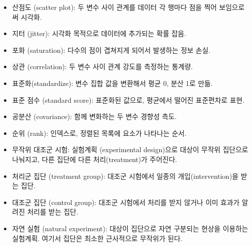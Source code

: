 \begin{itemize}

\item 산점도 (scatter plot): 두 변수 사이 관계를 데이터 각 행마다 점을 찍어 보임으로써 시각화.

\item 지터 (jitter): 시각화 목적으로 데이터에 추가되는 확률 잡음.

\item 포화 (saturation): 다수의 점이 겹쳐지게 되어서 발생하는 정보 손실.

\item 상관 (correlation): 두 변수 사이 관계 강도를 측정하는 통계량.

\item 표준화(standardize): 변수 집합 값을 변환해서 평균 0, 분산 1로 만듦.

\item 표준 점수 (standard score): 표준화된 값으로, 평균에서 떨어진 표준편차로 표현.

\item 공분산 (covariance): 함께 변화하는 두 변수 경향성 측도.

\item 순위 (rank): 인덱스로, 정렬된 목록에 요소가 나타나는 순서.

\item 무작위 대조군 시험: 실험계획 (experimental design)으로 대상이 무작위 집단으로 나눠지고, 다른 집단에 다른 처리(treatment)가 주어진다.

\item 처리군 집단 (treatment group): 대조군 시험에서 일종의 개입(intervention)을 받는 집단.

\item 대조군 집단 (control group): 대조군 시험에서 처리를 받지 않거나 이미 효과가 알려진 처리를 받는 집단.

\item 자연 실험 (natural experiment): 대상이 집단으로 자연 구분되는 현상을 이용하는 실험계획. 여기서 집단은 최소한 근사적으로 무작위가 된다.

\end{itemize}

